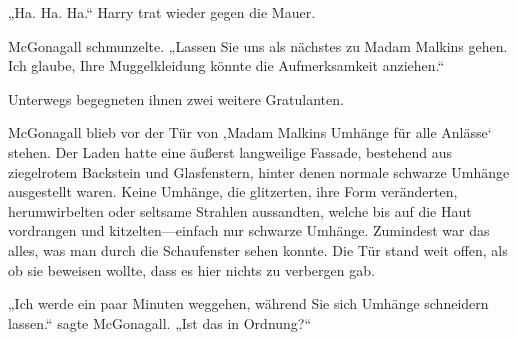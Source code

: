 „Ha. Ha. Ha.“ Harry trat wieder gegen die Mauer.

McGonagall schmunzelte. „Lassen Sie uns als nächstes zu Madam Malkins gehen. Ich glaube, Ihre Muggelkleidung könnte die Aufmerksamkeit anziehen.“

Unterwegs begegneten ihnen zwei weitere Gratulanten.

McGonagall blieb vor der Tür von ‚Madam Malkins Umhänge für alle Anlässe‘ stehen. Der Laden hatte eine äußerst langweilige Fassade, bestehend aus ziegelrotem Backstein und Glasfenstern, hinter denen normale schwarze Umhänge ausgestellt waren. Keine Umhänge, die glitzerten, ihre Form veränderten, herumwirbelten oder seltsame Strahlen aussandten, welche bis auf die Haut vordrangen und kitzelten—einfach nur schwarze Umhänge. Zumindest war das alles, was man durch die Schaufenster sehen konnte. Die Tür stand weit offen, als ob sie beweisen wollte, dass es hier nichts zu verbergen gab.

„Ich werde ein paar Minuten weggehen, während Sie sich Umhänge schneidern lassen.“ sagte McGonagall. „Ist das in Ordnung?“

